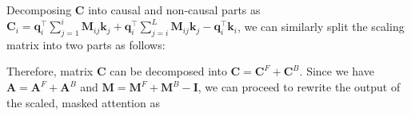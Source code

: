 Decomposing \(\mathbf{C}\) into causal and non-causal parts as 
$\mathbf{C}_i = {\mathbf{q}^{\top}_i\sum\nolimits_{j=1}^{i} \mathbf{M}_{ij}\mathbf{k}_j} + {\mathbf{q}^{\top}_i\sum\nolimits_{j=i}^{L} \mathbf{M}_{ij}\mathbf{k}_j} - \mathbf{q}^{\top}_i\mathbf{k}_i$,
we can similarly split the scaling matrix into two parts as follows:
\vspace{-2mm}


Therefore, matrix $\mathbf{C}$ can be decomposed into $\mathbf{C} = \mathbf{C}^F + \mathbf{C}^B$.  Since we  have $\mathbf{A} = \mathbf{A}^F + \mathbf{A}^B$ and $\mathbf{M} = \mathbf{M}^F + \mathbf{M}^B - \mathbf{I}$, we can proceed to rewrite the output of the scaled, masked attention as
\vspace{-3mm}

\hspace{-3mm}

